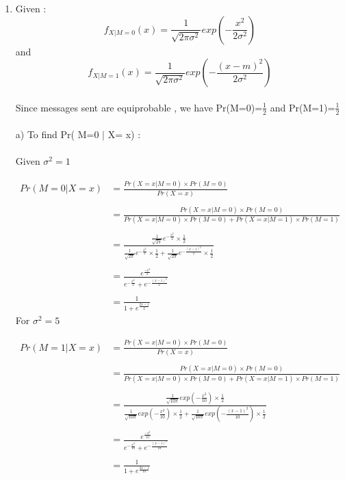 \documentclass{article}
\begin{document}
\begin{enumerate}
\item
  Given :
  $$f_{X|M=0}(x)=\frac{1}{\sqrt{2\pi\sigma^2}}exp(-\frac{x^2}{2\sigma^2})$$ and
  $$f_{X|M=1}(x)=\frac{1}{\sqrt{2\pi\sigma^2}}exp(-\frac{(x-m)^2}{2\sigma^2})$$
  \\
  Since messages sent are equiprobable , we have Pr(M=0)=$\frac{1}{2}$ and Pr(M=1)=$\frac{1}{2}$
  \\
  \\
  a) To find Pr( M=0 $|$ X= x) :
  \hspace{2mm}
  \\
  \\ Given $\sigma^2=1$

  \begin{equation}
    \begin{split}
      Pr( M=0| X= x) & = \frac{Pr( X = x | M=0 ) \times Pr(M=0)}{Pr(X = x)}\\ \\
	  & = \frac{Pr(X = x| M= 0 )\times Pr(M = 0)}{Pr(X=x| M = 0 ) \times Pr(M=0) + Pr(X=x| M = 1 ) \times Pr(M = 1)}\\ \\
	  & =\frac{ \frac{1}{\sqrt{2\pi}}e^{-\frac{x^2}{2}} \times \frac{1}{2}}{ \frac{1}{\sqrt{2\pi}}e^{-\frac{x^2}{2}} \times \frac{1}{2} +  \frac{1}{\sqrt{2\pi}}e^{-\frac{(x-1)^2}{2}} \times \frac{1}{2}} \\ \\
	  & = \frac{e^{\frac{-x^{2}}{2}}}{e^{-\frac{x^2}{2}}+e^{-\frac{(x-1)^2}{2}}}\\ \\
	  & = \frac{1}{1+e^\frac{{2x-1}}{2}}
    \end{split}
  \end{equation}
  \newpage
  For $\sigma^{2}=5 $

  \begin{equation}
    \begin{split}
      Pr( M=1| X= x) & = \frac{Pr( X = x | M=0 ) \times Pr(M=0)}{Pr(X = x)}\\ \\
	  & = \frac{Pr(X = x| M= 0 )\times Pr(M = 0)}{Pr(X=x| M = 0 ) \times Pr(M=0) + Pr(X=x| M = 1 ) \times Pr(M = 1)}\\ \\
	  & =\frac{ \frac{1}{\sqrt{10\pi}}exp(-\frac{x^2}{10}) \times \frac{1}{2}}{ \frac{1}{\sqrt{10\pi}}exp(-\frac{x^2}{10}) \times 				\frac{1}{2} +  \frac{1}{\sqrt{10\pi}}exp(-\frac{(x-1)^2}{10}) \times \frac{1}{2}} \\ \\
	  & = \frac{e^{\frac{-x^{2}}{10}}}{e^{-\frac{x^2}{10}}+e^{-\frac{(x-1)^2}{10}}}\\ \\
	  & = \frac{1}{1+e^\frac{{2x-1}}{10}}
    \end{split}
  \end{equation}




\end{enumerate}
\end{document}
